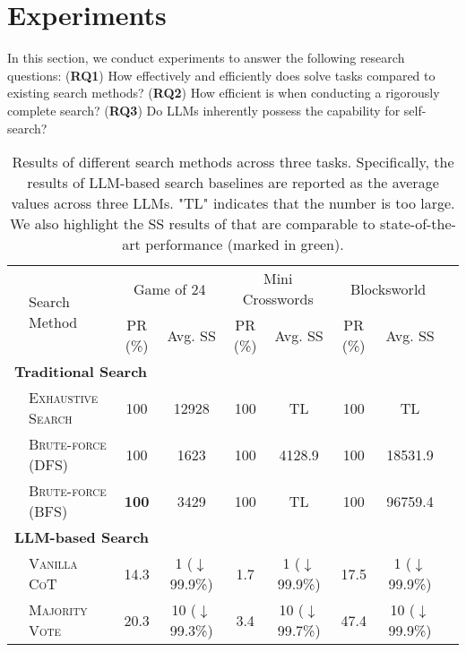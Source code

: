 \section{Experiments}
In this section, we conduct experiments to answer the following research questions: (\textbf{RQ1}) How effectively and efficiently does \method solve tasks compared to existing search methods? (\textbf{RQ2}) How efficient is \method when conducting a rigorously complete search? (\textbf{RQ3}) Do LLMs inherently possess the capability for self-search?
\begin{table*}[t]
\caption{Results of different search methods across three tasks. Specifically, the results of LLM-based search baselines are reported as the average values across three LLMs. "TL" indicates that the number is too large. We also highlight the SS results of \method that are comparable to state-of-the-art performance (marked in \colorbox{green!36}{green}). 
}
\vspace*{-0.5em}
\centering
\small
\tabcolsep 3.5pt
\renewcommand\arraystretch{1.0}
\begin{tabular}{llccccccc}
\toprule
\multirow{2}{*}{} &
\multirow{2}{*}{Search Method} &
\multicolumn{2}{c}{Game of 24} &
\multicolumn{2}{c}{Mini Crosswords} &
\multicolumn{2}{c}{Blocksworld} \\
\cmidrule(r){3-4} \cmidrule(r){5-6} \cmidrule(r){7-8}
&  & PR (\%) & Avg. SS & PR (\%) & Avg. SS & PR (\%) & Avg. SS \\
\midrule
\multicolumn{8}{l}{\textbf{Traditional Search}} \\
\cmidrule(r){1-2}
&\textsc{Exhaustive Search}&\num{100} &\num{12928} &\num{100} & TL &\num{100} & TL\\
\addlinespace[0.1em]\hdashline\addlinespace[0.1em]
& \textsc{Brute-force (DFS)} & \num{100} & \num{1623} & \num{100} & \num{4128.9} & \num{100} & \num{18531.9} \\

& \textsc{Brute-force (BFS)} & \bfseries\num{100} & \num{3429} & \num{100} & {TL} & \num{100} & \num{96759.4} \\
\midrule
\multicolumn{8}{l}{\textbf{LLM-based Search}} \\
\cmidrule(r){1-2}
& \textsc{Vanilla CoT} & \num{14.3} & 1 ({$\downarrow$} 99.9\%) & \num{1.7} &  1 ({$\downarrow$} 99.9\%) & \num{17.5} &  1 ({$\downarrow$} 99.9\%) \\

& \textsc{Majority Vote} & \num{20.3} & \num{10} ({$\downarrow$} 99.3\%) & \num{3.4} & \num{10} ({$\downarrow$} 99.7\%) & {\num{47.4}} & \num{10} ({$\downarrow$} 99.9\%) \\


\end{tabular}
\end{table*}
